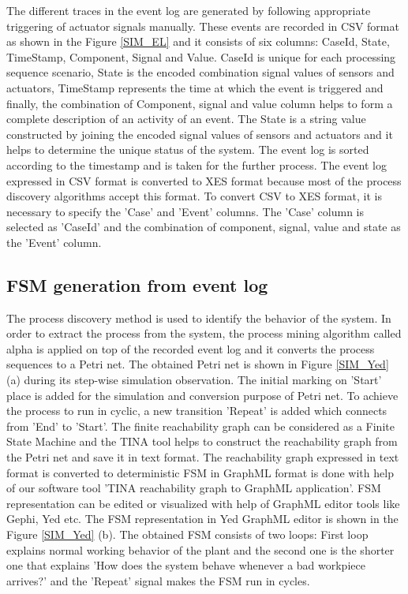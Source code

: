 \begin{bibunit}
The different traces in the event log are generated by following appropriate triggering of actuator signals manually. These events are recorded in CSV format as shown in the Figure \ref{SIM_EL} and it consists of six columns: CaseId, State, TimeStamp, Component, Signal and Value. CaseId is unique for each processing sequence scenario, State is the encoded combination signal values of sensors and actuators, TimeStamp represents the time at which the event is triggered and finally, the combination of Component, signal and value column helps to form a complete description of an activity of an event. The State is a string value constructed by joining the encoded signal values of sensors and actuators and it helps to determine the unique status of the system. The event log is sorted according to the timestamp and is taken for the further process. The event log expressed in CSV format is converted to XES format because most of the process discovery algorithms accept this format. To convert CSV to XES format, it is necessary to specify the ’Case’ and ’Event’ columns. The ’Case’ column is  selected as ’CaseId’ and the combination of component, signal, value and state as the ’Event’ column.

\subsection{FSM generation from event log}



The process discovery method is used to identify the behavior of the system. In order to extract the process from the system, the process mining algorithm called alpha  is applied on top of the recorded event log and it converts the process sequences to  a Petri net. The obtained Petri net is shown in Figure \ref{SIM_Yed} (a) during its step-wise simulation observation. The initial marking on ’Start’ place is added for the simulation and conversion purpose of Petri net. To achieve the process to run in cyclic, a new transition ’Repeat’ is added  which connects from ’End’ to ’Start’. The finite reachability graph can be considered as a Finite State Machine and the TINA tool helps to construct the reachability graph from the Petri net and save it in text format. The reachability graph expressed in text format is converted to deterministic FSM in GraphML format is done with help of our software tool 'TINA reachability graph to GraphML application'. FSM representation can be edited or visualized with help of GraphML editor tools like Gephi, Yed etc. The FSM representation in Yed GraphML editor is shown in the Figure \ref{SIM_Yed} (b). The obtained FSM consists of two loops: First loop explains normal working behavior of the plant and the second one is the shorter one that explains ’How does the system behave whenever a bad workpiece arrives?’ and the ’Repeat’ signal makes the FSM run in cycles.
 



\end{bibunit}
